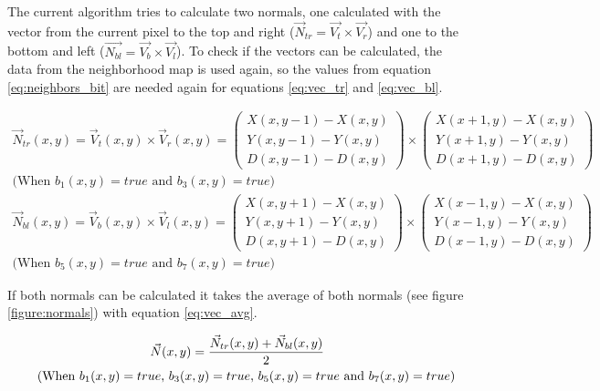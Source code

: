 The current algorithm tries to calculate two normals, one calculated with the vector from the current pixel to the top and right 
($\vec{N}_{tr}=\vec{V_t}\times\vec{V_r}$) and one to the bottom and left ($\vec{N_{bl}}=\vec{V_b}\times\vec{V_l}$). To check
if the vectors can be calculated, the data from the neighborhood map is used again, so the values from equation 
\vref{eq:neighbors_bit} are needed again for equations \vref{eq:vec_tr} and \vref{eq:vec_bl}. 


\begin{gather}
 \vec{N}_{tr}(x,y)=    \vec{V}_t(x,y) \times \vec{V}_r(x,y) =
                  \left( \begin{array}{c}   X(x,y-1) -  X(x,y)  \\ Y(x,y-1) -  Y(x,y) \\ D(x,y-1) -  D(x,y)\end{array} \right) 
           \times \left( \begin{array}{c}   X(x+1,y) -  X(x,y)  \\ Y(x+1,y) -  Y(x,y) \\ D(x+1,y) -  D(x,y)\end{array} \right)\nonumber
			\\\mbox{(When $b_1(x,y)=true$ and $b_3(x,y)=true$)}
\label{eq:vec_tr}\\
 \vec{N}_{bl}(x,y)=    \vec{V}_b(x,y) \times \vec{V}_l(x,y) =
                  \left( \begin{array}{c}   X(x,y+1) -  X(x,y)  \\ Y(x,y+1) -  Y(x,y) \\ D(x,y+1) -  D(x,y)\end{array} \right) 
           \times \left( \begin{array}{c}   X(x-1,y) -  X(x,y)  \\ Y(x-1,y) -  Y(x,y) \\ D(x-1,y) -  D(x,y)\end{array} \right)\nonumber
			\\\mbox{(When $b_5(x,y)=true$ and $b_7(x,y)=true$)}
\label{eq:vec_bl}
\end{gather}

If both normals can be calculated it takes the average of both normals (see figure \vref{figure:normals}) with equation 
\vref{eq:vec_avg}.

\begin{gather}
	\vec{N}(x,y) = \frac{\vec{N}_{tr}(x,y) + \vec{N}_{bl}(x,y)}{2}\nonumber\\
\mbox{\hspace{0.5cm}(When $b_1(x,y)=true$, $b_3(x,y)=true$, $b_5(x,y)=true$ and $b_7(x,y)=true$)}
\label{eq:vec_avg} 
\end{gather} 


